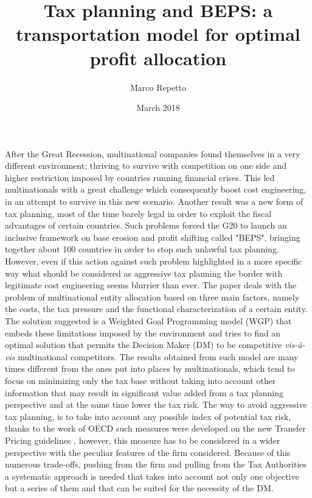 \documentclass{article}
\begin{document}
\title{Tax planning and BEPS: a transportation model for optimal profit allocation}

\author{Marco Repetto}

\date{March 2018}

\maketitle

After the Great Recession, multinational companies found themselves in a very different environment; thriving to survive with competition on one side and higher restriction imposed by countries running financial crises. This led multinationals with a great challenge which consequently boost cost engineering, in an attempt to survive in this new scenario. Another result was a new form of tax planning, most of the time barely legal in order to exploit the fiscal advantages of certain countries\cite{After_tax_hedging_report_2013}. Such problems forced the G20 to launch an inclusive framework on base erosion and profit shifting called "BEPS", bringing together about 100 countries in order to stop such unlawful tax planning. However, even if this action against such problem highlighted in a more specific way what should be considered as aggressive tax planning the border with legitimate cost engineering seems blurrier than ever\cite{feller_three_2017}.
The paper deals with the problem of multinational entity allocation based on three main factors, namely the costs, the tax pressure and the functional characterization of a certain entity. The solution suggested is a Weighted Goal Programming model (WGP) that embeds these limitations imposed by the environment and tries to find an optimal solution that permits the Decision Maker (DM) to be competitive \textit{vis-à-vis} multinational competitors. The results obtained from such model are many times different from the ones put into places by multinationals, which tend to focus on minimizing only the tax base without taking into account other information that may result in significant value added from a tax planning perspective and at the same time lower the tax risk. 
The way to avoid aggressive tax planning, is to take into account any possible index of potential tax risk, thanks to the work of OECD such measures were developed on the new Transfer Pricing guidelines \cite{TPguide2017}, however, this measure has to be considered in a wider perspective with the peculiar features of the firm considered. Because of this numerous trade-offs, pushing from the firm and pulling from the Tax Authorities a systematic approach is needed that takes into account not only one objective but a series of them and that can be suited for the necessity of the DM.
\end{document}
